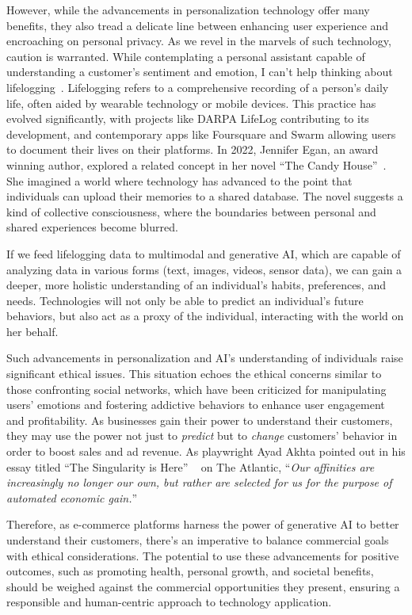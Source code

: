 \documentclass[11pt]{article}
\begin{document}
However, while the advancements in personalization technology offer many benefits, they also tread a delicate line between enhancing user experience and encroaching on personal privacy. As we revel in the marvels of such technology, caution is warranted. While contemplating a personal assistant capable of understanding a customer’s sentiment and emotion, I can’t help thinking about lifelogging~\cite{lifelogging}. Lifelogging refers to a comprehensive recording of a person's daily life, often aided by wearable technology or mobile devices. This practice has evolved significantly, with projects like DARPA LifeLog contributing to its development, and contemporary apps like Foursquare and Swarm allowing users to document their lives on their platforms. In 2022, Jennifer Egan, an award winning author, explored a related concept in her novel “The Candy House”~\cite{candyhouse}. She imagined a world where technology has advanced to the point that individuals can upload their memories to a shared database. The novel suggests a kind of collective consciousness, where the boundaries between personal and shared experiences become blurred.

If we feed lifelogging data to multimodal and generative AI, which are capable of analyzing data in various forms (text, images, videos, sensor data), we can gain a deeper, more holistic understanding of an individual's habits, preferences, and needs. Technologies will not only be able to predict an individual’s future behaviors, but also act as a proxy of the individual, interacting with the world on her behalf.

Such advancements in personalization and AI's understanding of individuals raise significant ethical issues. This situation echoes the ethical concerns similar to those confronting social networks, which have been criticized for manipulating users’ emotions and fostering addictive behaviors to enhance user engagement and profitability. As businesses gain their power to understand their customers, they may use the power not just to {\it predict} but to {\it change} customers’ behavior in order to boost sales and ad revenue. As playwright Ayad Akhta pointed out in his essay titled “The Singularity is Here” ~\cite{atlantic2021} on The Atlantic, “{\it Our affinities are increasingly no longer our own, but rather are selected for us for the purpose of automated economic gain.}”

Therefore, as e-commerce platforms harness the power of generative AI to better understand their customers, there’s an imperative to balance commercial goals with ethical considerations. The potential to use these advancements for positive outcomes, such as promoting health, personal growth, and societal benefits, should be weighed against the commercial opportunities they present, ensuring a responsible and human-centric approach to technology application.
\end{document}
